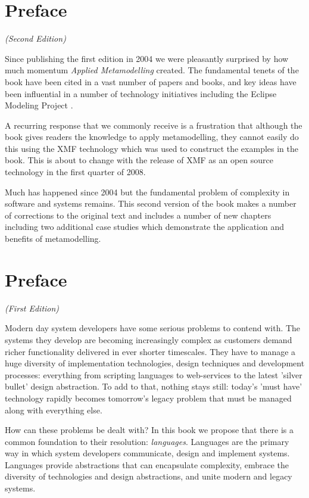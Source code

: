 \chapter*{Preface}
\LARGE{\emph{(Second Edition)}}\\[2cm]
\normalsize

Since publishing the first edition in 2004 we were pleasantly surprised by how much momentum
\emph{Applied Metamodelling} created.  The fundamental tenets of the book have been cited in a vast
number of papers and books, and key ideas have been influential in a number of technology
initiatives including the Eclipse Modeling Project \cite{EMP}.

A recurring response that we
commonly receive is a frustration that although the book gives readers the knowledge to apply
metamodelling, they cannot easily do this using the XMF technology which was used to construct
the examples in the book.  This is about to change with the release of XMF as an open source
technology in the first quarter of 2008.

Much has happened since 2004 but the fundamental problem of complexity in software and systems
remains.  This second version of the book makes a number of corrections to the original text and
includes a number of new chapters including two additional case studies which demonstrate the
application and benefits of metamodelling.

\chapter*{Preface}
\LARGE{\emph{(First Edition)}}\\[2cm]
\normalsize

Modern day system developers have some serious problems to contend
with. The systems they develop are becoming increasingly complex
as customers demand richer functionality delivered in ever shorter
timescales. They have to manage a huge diversity of implementation
technologies, design techniques and development processes:
everything from scripting languages to web-services to the latest
'silver bullet' design abstraction. To add to that, nothing stays
still: today's 'must have' technology rapidly becomes tomorrow's
legacy problem that must be managed along with everything else.

How can these problems be dealt with? In this book we propose that
there is a common foundation to their resolution: {\em languages}.
Languages are the primary way in which system developers
communicate, design and implement systems. Languages provide
abstractions that can encapsulate complexity, embrace the
diversity of technologies and design abstractions, and unite
modern and legacy systems.

